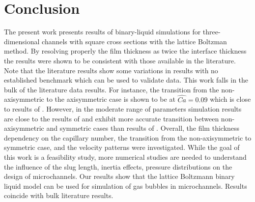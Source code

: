 \documentclass{article}
\begin{document}
\section{Conclusion}
The present work presents results of binary-liquid simulations for three-dimensional channels with square
cross sections with the lattice Boltzman method. By resolving properly the film thickness as twice the
interface thickness \cite{kuzmin-binary2d} the results were shown to be consistent with those
available in the literature. Note that the literature results show some variations in results with
no established benchmark which can be used to validate data. This work falls in the bulk of the
literature data results. For instance, the  transition from the non-axisymmetric to the
axisymmetric case is shown to be at $\widehat{Ca}=0.09$ which is close to results of
\citet{wang-non-circular}. However, in the moderate range of parameters simulation results are
close to the results of \citet{heil-threedim} and exhibit more accurate transition between
non-axisymmetric and symmetric cases than results of \citet{wang-non-circular}. Overall, the film
thickness dependency on the capillary number, the
transition from the non-axisymmetric to symmetric case, and the velocity patterns were investigated.
While
the goal of this work is a feasibility study, more numerical studies are needed to
understand the influence of the slug length, inertia effects, pressure distributions
\cite{kreutzer-taylor,yue-mass} on the design of microchannels. Our results show that the lattice
Boltzmann binary liquid model can be used for simulation of gas bubbles in microchannels. Results
coincide with bulk literature results. 

\appendix
\end{document}
